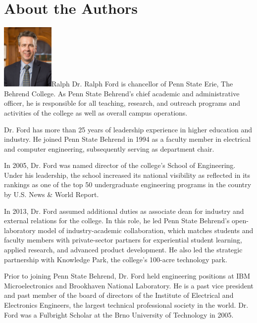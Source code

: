 \section{About the Authors}\label{about-the-authors}

\includegraphics[width=1in]{./Fig/Ford.jpg}Ralph
Dr. Ralph Ford is chancellor of Penn State Erie, The Behrend College. As Penn State Behrend’s chief 
academic and administrative officer, he is responsible for all teaching, research, and outreach 
programs and activities of the college as well as overall campus operations.

Dr. Ford has more than 25 years of leadership experience in higher education and industry. He
 joined Penn State Behrend in 1994 as a faculty member in electrical and computer engineering, 
 subsequently serving as department chair.

In 2005, Dr. Ford was named director of the college’s School of Engineering. Under his leadership,
the school increased its national visibility as reflected in its rankings as one of the top 50 
undergraduate engineering programs in the country by U.S. News \& World Report.

In 2013, Dr. Ford assumed additional duties as associate dean for industry and external 
relations for the college. In this role, he led Penn State Behrend’s open-laboratory model
 of industry-academic collaboration, which matches students and faculty members with 
 private-sector partners for experiential student learning, applied research, and advanced
  product development. He also led the strategic partnership with Knowledge Park, the 
  college’s 100-acre technology park.

Prior to joining Penn State Behrend, Dr. Ford held engineering positions at IBM Microelectronics 
and Brookhaven National Laboratory. He is a past vice president and past member of the
 board of directors of the Institute of Electrical and Electronics Engineers, the largest technical 
 professional society in the world. Dr. Ford was a Fulbright Scholar at the Brno University of 
 Technology in 2005.

